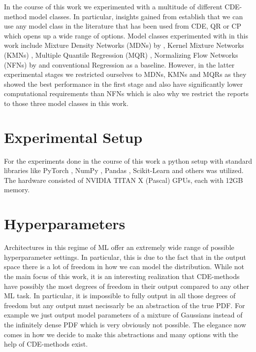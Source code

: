 In the course of this work we experimented with a multitude of different CDE-method model classes. In particular, insights gained from  establish that we can use any model class in the literature that has been used from CDE, QR or CP which opens up a wide range of options. Model classes experimented with in this work include Mixture Density Networks (MDNs) by \cite{bishop1994mixture}, Kernel Mixture Networks (KMNs) \cite{ambrogioni2017kernel}, Multiple Quantile Regression (MQR) \cite{gupta2022nested,moon2021learning}, Normalizing Flow Networks (NFNs) by \cite{trippe2018conditional} and conventional Regression as a baseline. However, in the latter experimental stages we restricted ourselves to MDNs, KMNs and MQRs as they showed the best performance in the first stage and also have significantly lower computational requirements than NFNs which is also why we restrict the reports to those three model classes in this work.

\section{Experimental Setup}\label{sec:experimental_setup}

For the experiments done in the course of this work a python setup with standard libraries like PyTorch \cite{paszke2019pytorch}, NumPy \cite{harris2020array}, Pandas \cite{reback2020pandas}, Scikit-Learn \cite{scikit-learn} and others was utilized. The hardware consisted of NVIDIA TITAN X (Pascal) GPUs, each with 12GB memory.

\section{Hyperparameters}\label{sec:hyperparameters}

Architectures in this regime of ML offer an extremely wide range of possible hyperparameter settings. In particular, this is due to the fact that in the output space there is a lot of freedom in how we can model the distribution. While not the main focus of this work, it is an interesting realization that CDE-methods have possibly the most degrees of freedom in their output compared to any other ML task. In particular, it is impossible to fully output in all those degrees of freedom but any output must necissarly be an abstraction of the true PDF. For example we just output model parameters of a mixture of Gaussians instead of the infinitely dense PDF which is very obviously not possible. The elegance now comes in how we decide to make this abstractions and many options with the help of CDE-methods exist.

